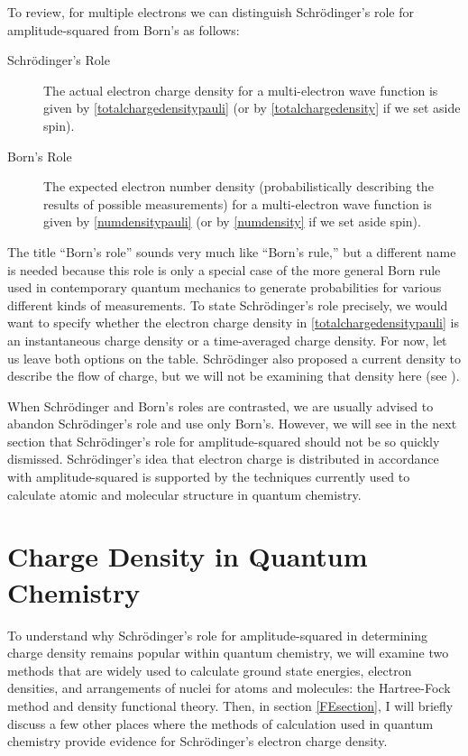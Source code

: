 \documentclass[12pt,onecolumn,secnumarabic,amsmath,amssymb,balancelastpage,nofootinbib]{article}
\begin{document}
To review, for multiple electrons we can distinguish Schr\"{o}dinger's role for amplitude-squared from Born's as follows:
\begin{description}
\item [Schr\"{o}dinger's Role]  The actual electron charge density for a multi-electron wave function is given by \eqref{totalchargedensitypauli} (or by \eqref{totalchargedensity} if we set aside spin).
\item [Born's Role]  The expected electron number density (probabilistically describing the results of possible measurements) for a multi-electron wave function is given by \eqref{numdensitypauli} (or by \eqref{numdensity} if we set aside spin).
\end{description}
The title ``Born's role'' sounds very much like ``Born's rule,'' but a different name is needed because this role is only a special case of the more general Born rule used in contemporary quantum mechanics to generate probabilities for various different kinds of measurements.  To state Schr\"{o}dinger's role precisely, we would want to specify whether the electron charge density in \eqref{totalchargedensitypauli} is an instantaneous charge density or a time-averaged charge density.  For now, let us leave both options on the table.  Schr\"{o}dinger \cite{schrodinger1926pt4} also proposed a current density to describe the flow of charge, but we will not be examining that density here (see \cite{bader2010}).

When Schr\"{o}dinger and Born's roles are contrasted, we are usually advised to abandon Schr\"{o}dinger's role and use only Born's.  However, we will see in the next section that Schr\"{o}dinger's role for amplitude-squared should not be so quickly dismissed.  Schr\"{o}dinger's idea that electron charge is distributed in accordance with amplitude-squared is supported by the techniques currently used to calculate atomic and molecular structure in quantum chemistry.









\section{Charge Density in Quantum Chemistry}\label{QCsection}

To understand why Schr\"{o}dinger's role for amplitude-squared in determining charge density remains popular within quantum chemistry, we will examine two methods that are widely used to calculate ground state energies, electron densities, and arrangements of nuclei for atoms and molecules: the Hartree-Fock method and density functional theory.  Then, in section \ref{FEsection}, I will briefly discuss a few other places where the methods of calculation used in quantum chemistry provide evidence for Schr\"{o}dinger's electron charge density.
\end{document}

